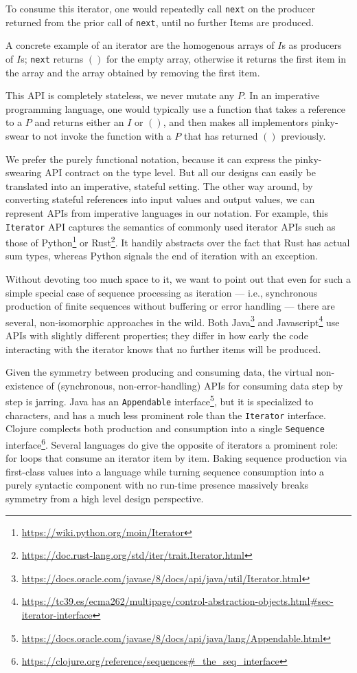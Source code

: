 \documentclass[sigplan,screen,10pt,anonymous,review]{acmart}
\begin{document}
To consume this iterator, one would repeatedly call \texttt{next} on the producer returned from the prior call of \texttt{next}, until no further Items are produced.

A concrete example of an iterator are the homogenous arrays of $I$s as producers of $I$s; \texttt{next} returns $()$ for the empty array, otherwise it returns the first item in the array and the array obtained by removing the first item.

This API is completely stateless, we never mutate any $P$. In an imperative programming language, one would typically use a function that takes a reference to a $P$ and returns either an $I$ or $()$, and then makes all implementors pinky-swear to not invoke the function with a $P$ that has returned $()$ previously.

We prefer the purely functional notation, because it can express the pinky-swearing API contract on the type level. But all our designs can easily be translated into an imperative, stateful setting. The other way around, by converting stateful references into input values and output values, we can represent APIs from imperative languages in our notation. For example, this \texttt{Iterator} API captures the semantics of commonly used iterator APIs such as those of Python\footnote{\url{https://wiki.python.org/moin/Iterator}} or Rust\footnote{\url{https://doc.rust-lang.org/std/iter/trait.Iterator.html}}. It handily abstracts over the fact that Rust has actual sum types, whereas Python signals the end of iteration with an exception.

Without devoting too much space to it, we want to point out that even for such a simple special case of sequence processing as iteration --- i.e., synchronous production of finite sequences without buffering or error handling --- there are several, non-isomorphic approaches in the wild. Both Java\footnote{\url{https://docs.oracle.com/javase/8/docs/api/java/util/Iterator.html}} and Javascript\footnote{\url{https://tc39.es/ecma262/multipage/control-abstraction-objects.html\#sec-iterator-interface}} use APIs with slightly different properties; they differ in how early the code interacting with the iterator knows that no further items will be produced.

Given the symmetry between producing and consuming data, the virtual non-existence of (synchronous, non-error-handling) APIs for consuming data step by step is jarring. Java has an \texttt{Appendable} interface\footnote{\url{https://docs.oracle.com/javase/8/docs/api/java/lang/Appendable.html}}, but it is specialized to characters, and has a much less prominent role than the \texttt{Iterator} interface. Clojure complects both production and consumption into a single \texttt{Sequence} interface\footnote{\url{https://clojure.org/reference/sequences\#_the_seq_interface}}. Several languages do give the opposite of iterators a prominent role: for loops that consume an iterator item by item. Baking sequence production via first-class values into a language while turning sequence consumption into a purely syntactic component with no run-time presence massively breaks symmetry from a high level design perspective.
\end{document}
